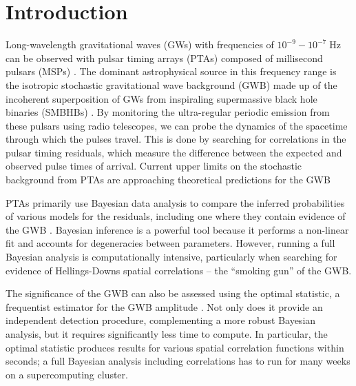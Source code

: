 \documentclass[twocolumn,aps,prd,superscriptaddress]{revtex4-1}
\begin{document}
\maketitle


\section{Introduction}

Long-wavelength gravitational waves (GWs) with frequencies of 
$10^{-9} - 10^{-7} \; \mathrm{Hz}$ can be observed with pulsar timing arrays (PTAs) 
composed of millisecond pulsars (MSPs) \cite{hd1983,fb1990}. 
The dominant astrophysical source in this frequency range is the isotropic stochastic 
gravitational wave background (GWB) 
made up of the incoherent superposition of GWs from inspiraling 
supermassive black hole binaries (SMBHBs) 
\citep{1995ApJ...446..543R, 2003ApJ...583..616J, 2003ApJ...590..691W}. 
By monitoring the ultra-regular periodic emission from these pulsars using radio telescopes, 
we can probe the dynamics of the spacetime through which the pulses travel. 
This is done by searching for correlations in the pulsar timing residuals, 
which measure the difference between the expected and observed pulse times of arrival. 
Current upper limits on the stochastic background from PTAs are approaching 
theoretical predictions for the GWB \citep{PPTA2013,EPTA2015,abb+17b}

PTAs primarily use Bayesian data analysis to compare the inferred probabilities 
of various models for the residuals, 
including one where they contain evidence of the GWB 
\citep{vlm+2009,lah+2013}. 
Bayesian inference is a powerful tool because 
it performs a non-linear fit and 
accounts for degeneracies between parameters. 
However, running a full Bayesian analysis is computationally intensive, 
particularly when searching for evidence of Hellings-Downs spatial correlations --
the ``smoking gun'' of the GWB.

The significance of the GWB can also be assessed using the 
optimal statistic, a frequentist estimator for the GWB amplitude \citep{abc+2009,demorest+2013,ccs+2015}. 
Not only does it provide an independent detection procedure, complementing a more robust Bayesian analysis, but it requires significantly less time to compute. In particular, the optimal statistic produces results for various spatial correlation functions within seconds; a full Bayesian analysis including correlations has to run for many weeks on a supercomputing cluster. 
\end{document}
